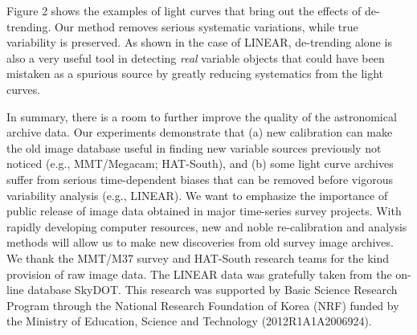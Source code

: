 \noindent Figure 2 shows the examples of light curves that bring out the effects of de-trending.  Our method removes serious systematic variations, while true variability is preserved.  As shown in the case of LINEAR, de-trending alone is also a very useful tool in detecting {\itshape real} variable objects that could have been mistaken as a spurious source by greatly reducing systematics from the light curves.

In summary, there is a room to further improve the quality of the astronomical archive data.  Our experiments demonstrate that (a) new calibration can make the old image database useful in finding new variable sources previously not noticed (e.g., MMT/Megacam; HAT-South), and (b) some light curve archives suffer from serious time-dependent biases that can be removed before vigorous variability analysis (e.g., LINEAR).  We want to emphasize the importance of public release of image data obtained in major time-series survey projects.  With rapidly developing computer resources, new and noble re-calibration and analysis methods will allow us to make new discoveries from old survey image archives.  \\

\acknowledgements We thank the MMT/M37 survey and HAT-South research teams for the kind provision of raw image data.  The LINEAR data was gratefully taken from the on-line database SkyDOT.  This research was supported by Basic Science Research Program through the National Research Foundation of Korea (NRF) funded by the Ministry of Education, Science and Technology (2012R1A1A2006924).



